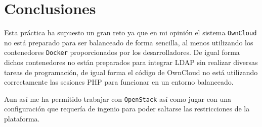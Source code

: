 \chapter{Conclusiones}

Esta práctica ha supuesto un gran reto ya que en mi opinión el sistema \texttt{OwnCloud} no está preparado para ser balanceado de forma sencilla, al menos utilizando los contenedores \texttt{Docker} proporcionados por los desarrolladores. De igual forma dichos contenedores no están preparados para integrar LDAP sin realizar diversas tareas de programación, de igual forma el código de OwnCloud no está utilizando correctamente las sesiones PHP para funcionar en un entorno balanceado.

\bigskip
Aun así me ha permitido trabajar con \texttt{OpenStack} así como jugar con una configuración que requería de ingenio para poder saltarse las restricciones de la plataforma.